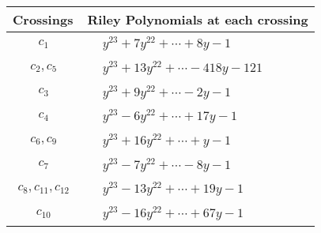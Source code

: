 \documentclass[1p]{elsarticle_modified}
\theoremstyle{definition}
\begin{document}
\begin{tabular}{m{50pt}|m{274pt}}
Crossings & \hspace{64pt}Riley Polynomials at each crossing \\
\hline $$\begin{aligned}c_{1}\end{aligned}$$&$\begin{aligned}
&y^{23}+7 y^{22}+\cdots+8 y-1
\end{aligned}$\\
\hline $$\begin{aligned}c_{2},c_{5}\end{aligned}$$&$\begin{aligned}
&y^{23}+13 y^{22}+\cdots-418 y-121
\end{aligned}$\\
\hline $$\begin{aligned}c_{3}\end{aligned}$$&$\begin{aligned}
&y^{23}+9 y^{22}+\cdots-2 y-1
\end{aligned}$\\
\hline $$\begin{aligned}c_{4}\end{aligned}$$&$\begin{aligned}
&y^{23}-6 y^{22}+\cdots+17 y-1
\end{aligned}$\\
\hline $$\begin{aligned}c_{6},c_{9}\end{aligned}$$&$\begin{aligned}
&y^{23}+16 y^{22}+\cdots+y-1
\end{aligned}$\\
\hline $$\begin{aligned}c_{7}\end{aligned}$$&$\begin{aligned}
&y^{23}-7 y^{22}+\cdots-8 y-1
\end{aligned}$\\
\hline $$\begin{aligned}c_{8},c_{11},c_{12}\end{aligned}$$&$\begin{aligned}
&y^{23}-13 y^{22}+\cdots+19 y-1
\end{aligned}$\\
\hline $$\begin{aligned}c_{10}\end{aligned}$$&$\begin{aligned}
&y^{23}-16 y^{22}+\cdots+67 y-1
\end{aligned}$\\
\hline
\end{tabular}\\~\\
\end{document}
